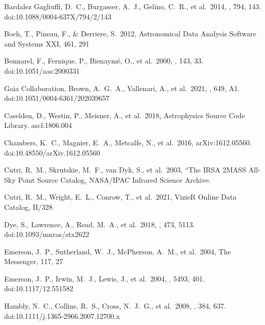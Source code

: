 \documentclass[twocolumn]{aastex631}
\begin{document}
\newpage 

\begin{thebibliography}{}

 Bardalez Gagliuffi, D.~C., Burgasser, A.~J., Gelino, C.~R., et al.\ 2014, \apj, 794, 143. doi:10.1088/0004-637X/794/2/143

 Boch, T., Pineau, F., \& Derriere, S.\ 2012, Astronomical Data Analysis Software and Systems XXI, 461, 291

 Bonnarel, F., Fernique, P., Bienaym{\'e}, O., et al.\ 2000, \aaps, 143, 33. doi:10.1051/aas:2000331

 Gaia Collaboration, Brown, A.~G.~A., Vallenari, A., et al.\ 2021, \aap, 649, A1. doi:10.1051/0004-6361/202039657

 Caselden, D., Westin, P., Meisner, A., et al.\ 2018, Astrophysics Source Code Library. ascl:1806.004

 Chambers, K.~C., Magnier, E.~A., Metcalfe, N., et al.\ 2016, arXiv:1612.05560. doi:10.48550/arXiv.1612.05560

 Cutri, R.~M., Skrutskie, M.~F., van Dyk, S., et al.\ 2003, ``The IRSA 2MASS All-Sky Point Source Catalog, NASA/IPAC Infrared Science Archive. 

 Cutri, R.~M., Wright, E.~L., Conrow, T., et al.\ 2021, VizieR Online Data Catalog, II/328

 Dye, S., Lawrence, A., Read, M.~A., et al.\ 2018, \mnras, 473, 5113. doi:10.1093/mnras/stx2622

 Emerson, J.~P., Sutherland, W.~J., McPherson, A.~M., et al.\ 2004, The Messenger, 117, 27

 Emerson, J.~P., Irwin, M.~J., Lewis, J., et al.\ 2004, \procspie, 5493, 401. doi:10.1117/12.551582

 Hambly, N.~C., Collins, R.~S., Cross, N.~J.~G., et al.\ 2008, \mnras, 384, 637. doi:10.1111/j.1365-2966.2007.12700.x


\end{thebibliography}
\end{document}
